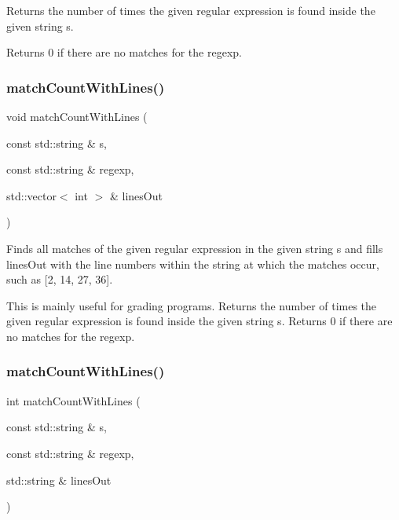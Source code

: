 Returns the number of times the given regular expression is found inside the given string s. 

Returns 0 if there are no matches for the regexp. \mbox{\label{namespacesgl_1_1priv_1_1regexpr_a5854e1254f8393744e2c10c998197f96}} 
\subsubsection{\texorpdfstring{match\+Count\+With\+Lines()}{matchCountWithLines()}\hspace{0.1cm}{\footnotesize\ttfamily [1/2]}}
{\footnotesize\ttfamily void match\+Count\+With\+Lines (\begin{DoxyParamCaption}\item[{const std\+::string \&}]{s,  }\item[{const std\+::string \&}]{regexp,  }\item[{std\+::vector$<$ int $>$ \&}]{lines\+Out }\end{DoxyParamCaption})}



Finds all matches of the given regular expression in the given string s and fills \textquotesingle{}lines\+Out\textquotesingle{} with the line numbers within the string at which the matches occur, such as \mbox{[}2, 14, 27, 36\mbox{]}. 

This is mainly useful for grading programs. Returns the number of times the given regular expression is found inside the given string s. Returns 0 if there are no matches for the regexp. \mbox{\label{namespacesgl_1_1priv_1_1regexpr_a5563a971ef7227d5d4f363243dfed74d}} 
\subsubsection{\texorpdfstring{match\+Count\+With\+Lines()}{matchCountWithLines()}\hspace{0.1cm}{\footnotesize\ttfamily [2/2]}}
{\footnotesize\ttfamily int match\+Count\+With\+Lines (\begin{DoxyParamCaption}\item[{const std\+::string \&}]{s,  }\item[{const std\+::string \&}]{regexp,  }\item[{std\+::string \&}]{lines\+Out }\end{DoxyParamCaption})}



